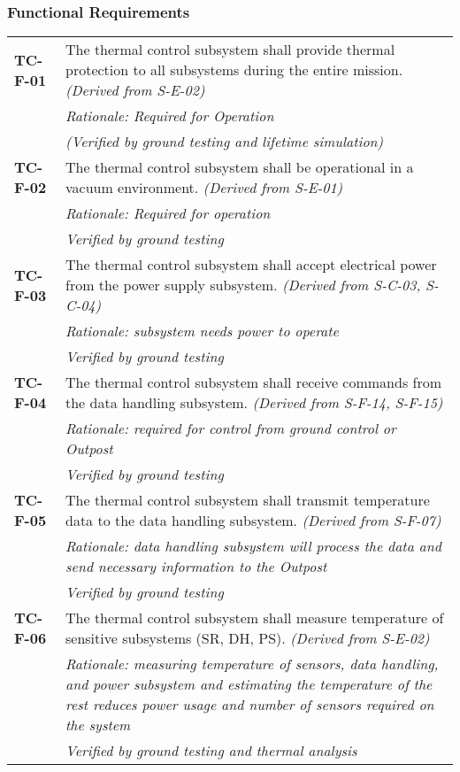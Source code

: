\subsubsection*{Functional Requirements}
\vspace{-15pt}
\begin{longtable}{P{2cm}P{13.25cm}}
\textbf{TC-F-01}	&
The thermal control subsystem shall provide thermal protection to all subsystems during the entire mission.
\textit{(Derived from S-E-02)} \\
& \textit{Rationale: Required for Operation} \\
& \textit{(Verified by ground testing and lifetime simulation)}	\\

\textbf{TC-F-02}	&
The thermal control subsystem shall be operational in a vacuum environment.
\textit{(Derived from S-E-01)}\\
& \textit{Rationale: Required for operation}	\\
& \textit{Verified by ground testing}	\\

\textbf{TC-F-03}	& The thermal control subsystem shall accept electrical power from the power supply subsystem. \textit{(Derived from S-C-03, S-C-04)}	\\
& \textit{Rationale: subsystem needs power to operate}	\\
& \textit{Verified by ground testing}	\\

\textbf{TC-F-04}	& The thermal control subsystem shall receive commands from the data handling subsystem.
\textit{(Derived from S-F-14, S-F-15)} \\
 & \textit{Rationale: required for control from ground control or Outpost} \\
 & \textit{Verified by ground testing}		\\

\textbf{TC-F-05}	& The thermal control subsystem shall transmit temperature data to the data handling subsystem. \textit{(Derived from S-F-07)} \\
 & \textit{Rationale: data handling subsystem will process the data and send necessary information to the Outpost} \\
  & \textit{Verified by ground testing}			\\

\textbf{TC-F-06}	& The thermal control subsystem shall measure temperature of sensitive subsystems (SR, DH, PS). \textit{(Derived from S-E-02)} \\
 & \textit{Rationale: measuring temperature of sensors, data handling, and power subsystem and estimating the temperature of the rest reduces power usage and number of sensors required on the system} \\
 & \textit{Verified by ground testing and thermal analysis}		\\


\end{longtable}
